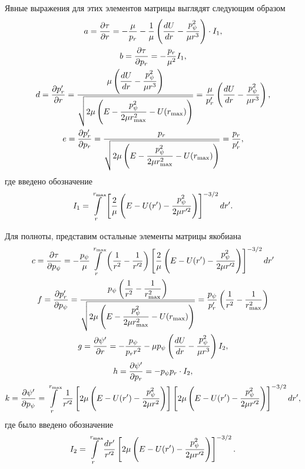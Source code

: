 Явные выражения для этих элементов матрицы выглядят следующим образом 
\begin{gather}
    a = \frac{\partial \tau}{\partial r} = -\frac{\mu}{p_r} - \frac{1}{\mu} \left( \frac{dU}{dr} - \frac{p_\psi^2}{\mu r^3} \right) \cdot I_1, \\ 
    b = \frac{\partial \tau}{\partial p_r} = - \frac{p_r}{\mu^2} I_1, \\ 
    d = \frac{\partial p_r^\prime}{\partial r} = \frac{\displaystyle \mu \left( \frac{dU}{dr} - \frac{p_\psi^2}{\mu r^3} \right)}{\displaystyle \sqrt{2\mu \left( E - \frac{p_\psi^2}{2 \mu r_\text{max}^2} - U(r_\text{max}) \right)}} = \frac{\mu}{p_r^\prime} \left( \frac{dU}{dr} - \frac{p_\psi^2}{\mu r^3} \right), \\
    e = \frac{\partial p_r^\prime}{\partial p_r} = \frac{p_r}{\displaystyle \sqrt{2\mu \left( E - \frac{p_\psi^2}{2 \mu r_\text{max}^2} - U(r_\text{max}) \right)}} = \frac{p_r}{p_r^\prime},
\end{gather}
%
где введено обозначение 
\begin{gather}
    I_1 = \int\limits_r^{r_\text{max}} \left[ \frac{2}{\mu} \left( E - U(r^\prime) - \frac{p_\psi^2}{2 \mu r^{\prime 2}} \right) \right]^{-3/2} dr^\prime. 
\end{gather}

Для полноты, представим остальные элементы матрицы якобиана
\begin{gather}
    c = \frac{\partial \tau}{\partial p_\psi} = -\frac{p_\psi}{\mu} \int\limits_r^{r_\text{max}} \left( \frac{1}{r^2} - \frac{1}{r^{\prime 2}} \right) \left[ \frac{2}{\mu} \left( E - U(r^\prime) - \frac{p_\psi^2}{2 \mu r^{\prime 2}} \right) \right]^{-3/2} dr^\prime \\
    f = \frac{\partial p_r^\prime}{\partial p_\psi} = \frac{\displaystyle p_\psi \left( \frac{1}{r^2} - \frac{1}{r_\text{max}^2} \right)}{\displaystyle \sqrt{2 \mu \left( E - \frac{p_\psi^2}{2 \mu r_\text{max}^2} - U(r_\text{max}) \right)}} = \frac{p_\psi}{p_r^\prime} \left( \frac{1}{r^2} - \frac{1}{r_\text{max}^2} \right) \\
    g = \frac{\partial \psi^\prime}{\partial r} = -\frac{p_\psi}{p_r r^2} - \mu p_\psi \left( \frac{dU}{dr} - \frac{p_\psi^2}{\mu r^3} \right) I_2, \\ 
    h = \frac{\partial \psi^\prime}{\partial p_r} = -p_\psi p_r \cdot I_2, \\ 
    k = \frac{\partial \psi^\prime}{\partial p_\psi} = \int\limits_r^{r_\text{max}} \frac{1}{r^{\prime 2}} \left[ 2 \mu \left( E - U(r^\prime) - \frac{p_\psi^2}{2 \mu r^2} \right) \right] \left[ 2 \mu \left( E - U(r^\prime) - \frac{p_\psi^2}{2 \mu r^{\prime 2}} \right)\right]^{-3/2} dr^\prime,
\end{gather}
%
где было введено обозначение
\begin{gather}
    I_2 = \int\limits_r^{r_\text{max}} \frac{dr^\prime}{r^{\prime 2}} \left[ 2 \mu \left( E - U(r^\prime) - \frac{p_\psi^2}{2 \mu r^{\prime 2}} \right) \right]^{-3/2}.
\end{gather}

